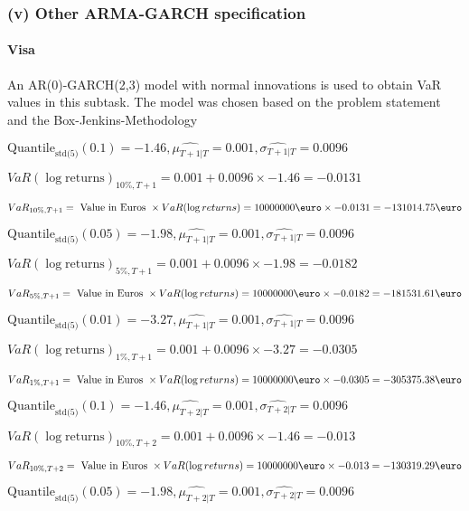 \subsubsection{(v) Other ARMA-GARCH specification}

\paragraph{Visa}
 An AR(0)-GARCH(2,3) model with normal innovations is used to obtain VaR values in this subtask. The model was chosen based on the problem statement and the Box-Jenkins-Methodology



$\text{Quantile}_\text{std(5)}(0.1) = -1.46,\hat{\mu_{T+1|T}} = 0.001, \hat{\sigma_{T+1|T}} = 0.0096$

$VaR(\log \text{returns})_{10\%, T + 1} = 0.001 + 0.0096\times-1.46 = -0.0131$

$VaR_{10\%, T + 1} = \text{ Value in Euros } \times VaR(\log returns) = 10 000 000 \text{\euro} \times-0.0131 = -131014.75 \text{\euro}$


$\text{Quantile}_\text{std(5)}(0.05) = -1.98,\hat{\mu_{T+1|T}} = 0.001, \hat{\sigma_{T+1|T}} = 0.0096$

$VaR(\log \text{returns})_{5\%, T + 1} = 0.001 + 0.0096\times-1.98 = -0.0182$

$VaR_{5\%, T + 1} = \text{ Value in Euros } \times VaR(\log returns) = 10 000 000 \text{\euro} \times-0.0182 = -181531.61 \text{\euro}$


$\text{Quantile}_\text{std(5)}(0.01) = -3.27,\hat{\mu_{T+1|T}} = 0.001, \hat{\sigma_{T+1|T}} = 0.0096$

$VaR(\log \text{returns})_{1\%, T + 1} = 0.001 + 0.0096\times-3.27 = -0.0305$

$VaR_{1\%, T + 1} = \text{ Value in Euros } \times VaR(\log returns) = 10 000 000 \text{\euro} \times-0.0305 = -305375.38 \text{\euro}$


$\text{Quantile}_\text{std(5)}(0.1) = -1.46,\hat{\mu_{T+2|T}} = 0.001, \hat{\sigma_{T+2|T}} = 0.0096$

$VaR(\log \text{returns})_{10\%, T + 2} = 0.001 + 0.0096\times-1.46 = -0.013$

$VaR_{10\%, T + 2} = \text{ Value in Euros } \times VaR(\log returns) = 10 000 000 \text{\euro} \times-0.013 = -130319.29 \text{\euro}$


$\text{Quantile}_\text{std(5)}(0.05) = -1.98,\hat{\mu_{T+2|T}} = 0.001, \hat{\sigma_{T+2|T}} = 0.0096$

